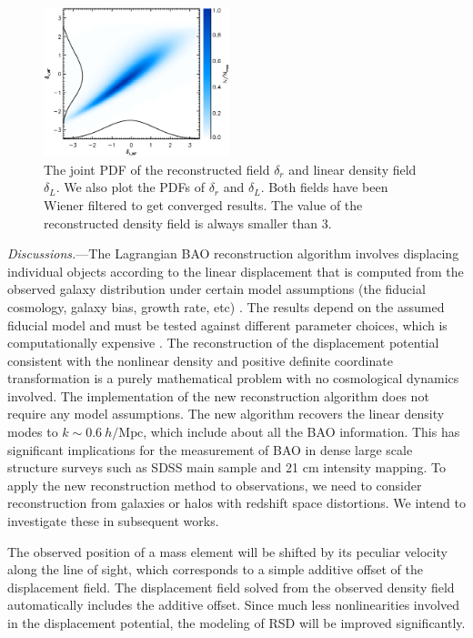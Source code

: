 \documentclass[aps,prl,twocolumn,showpacs,superscriptaddress,groupedaddress,nofootinbib]{revtex4}  %
\newcommand{\mr}{\mathrm}
\begin{document}
\begin{figure}[tbp]
\begin{center}
\includegraphics[width=0.48\textwidth]{pdfwf.eps}
\end{center}
\vspace{-0.7cm}
\caption{The joint PDF of the reconstructed field 
    $\delta_r$ and linear density field $\delta_L$. We also plot the 
PDFs of $\delta_r$ and $\delta_L$. Both fields
have been Wiener filtered to get converged results. The value of the 
reconstructed density field is always smaller than 3.}
\label{fig:pdf}
\end{figure}

{\it Discussions.}---The Lagrangian BAO reconstruction algorithm involves displacing 
individual objects according to the linear displacement that is computed from the observed
galaxy distribution under certain model assumptions (the fiducial cosmology, galaxy bias, 
growth rate, etc) \cite{2007bao,2015marcel}.
The results depend on the assumed fiducial model and must be tested against different 
parameter choices, which is computationally expensive \cite{2012nikhil}.
The reconstruction of the displacement potential consistent with the nonlinear density
and positive definite coordinate transformation is a purely mathematical problem with no
cosmological dynamics involved. 
The implementation of the new reconstruction algorithm does not require any model assumptions.
The new algorithm recovers the linear density modes to $k\sim0.6\ h/\mr{Mpc}$, 
which include about all the BAO information. 
This has significant implications for the measurement of BAO in dense large scale structure
surveys such as SDSS main sample and 21 cm intensity mapping.
To apply the new reconstruction method to observations, we need to consider 
reconstruction from galaxies or halos with redshift space distortions.
We intend to investigate these in subsequent works. 

The observed position of a mass element will be shifted by its peculiar
velocity along the line of sight, which corresponds to a simple additive offset of
the displacement field. The displacement field solved from the observed density field
automatically includes the additive offset. 
Since much less nonlinearities involved in the displacement potential, the modeling of RSD
will be improved significantly.
\end{document}
